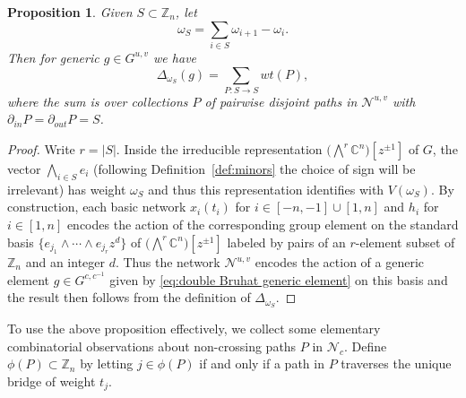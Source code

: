 \documentclass[12pt]{amsart}
\newcommand{\CC}{\mathbb{C}}
\newcommand{\ZZ}{\mathbb{Z}}
\newcommand{\cN}{\mathcal{N}} %
\newtheorem{proposition}[theorem]{Proposition}
\theoremstyle{remark}
\numberwithin{equation}{section}
\begin{document}
\begin{proposition}\label{prop:minorsfrompaths}
  Given $S \subset \ZZ_n$, let
  \[ \omega_S = \sum_{i \in S} \omega_{i+1} - \omega_i.\] 
  Then for generic $g\in G^{u,v}$ we have \[ \Delta_{\omega_S}(g) = \sum_{P: S \to S} wt(P), \]
  where the sum is over collections $P$ of pairwise disjoint paths in $\cN^{u,v}$ with $\partial_{in}P = \partial_{out}P = S$.
\end{proposition}
\begin{proof}
  Write $r=|S|$.  
  Inside the irreducible representation $\big(\!\bigwedge^{\!r}\CC^n\big)[z^{\pm 1}]$ of $G$, the vector $\bigwedge\limits_{i\in S} e_i$ (following Definition~\ref{def:minors} the choice of sign will be irrelevant) has weight $\omega_S$ and thus this representation identifies with $V(\omega_S)$.
  By construction, each basic network $x_i(t_i)$ for $i\in[-n,-1]\cup[1,n]$ and $h_i$ for $i\in[1,n]$ encodes the action of the corresponding group element on the standard basis $\{ e_{j_1} \wedge \cdots \wedge e_{j_r} z^d\}$ of $\big(\!\bigwedge^{\!r}\CC^n\big)[z^{\pm 1}]$ labeled by pairs of an $r$-element subset of $\ZZ_n$ and an integer $d$.  Thus the network $\cN^{u,v}$ encodes the action of a generic element $g\in G^{c,c^{-1}}$ given by \eqref{eq:double Bruhat generic element} on this basis and the result then follows from the definition of $\Delta_{\omega_S}$.
\end{proof}

To use the above proposition effectively, we collect some elementary combinatorial observations about non-crossing paths $P$ in $\cN_c$. 
Define $\phi(P)\subset\ZZ_n$ by letting $j\in\phi(P)$ if and only if a path in $P$ traverses the unique bridge of weight $t_j$.
\end{document}
